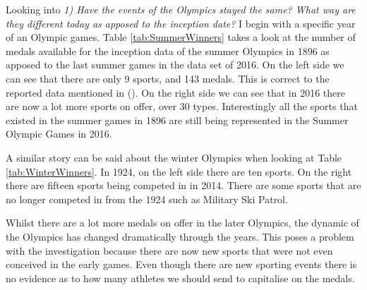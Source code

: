\documentclass[
]{article}
\begin{document}
Looking into \emph{1) Have the events of the Olympics stayed the same? What way are they different today as apposed to the inception date?} I begin with a specific year of an Olympic games. Table \ref{tab:SummerWinners} takes a look at the number of medals available for the inception data of the summer Olympics in 1896 as apposed to the last summer games in the data set of 2016. On the left side we can see that there are only 9 sports, and 143 medals. This is correct to the reported data mentioned in (). On the right side we can see that in 2016 there are now a lot more sports on offer, over 30 types. Interestingly all the sports that existed in the summer games in 1896 are still being represented in the Summer Olympic Games in 2016.

A similar story can be said about the winter Olympics when looking at Table \ref{tab:WinterWinners}. In 1924, on the left side there are ten sports. On the right there are fifteen sports being competed in in 2014. There are some sports that are no longer competed in from the 1924 such as Military Ski Patrol.

Whilst there are a lot more medals on offer in the later Olympics, the dynamic of the Olympics has changed dramatically through the years. This poses a problem with the investigation because there are now new sports that were not even conceived in the early games. Even though there are new sporting events there is no evidence as to how many athletes we should send to capitalise on the medals.
\end{document}

